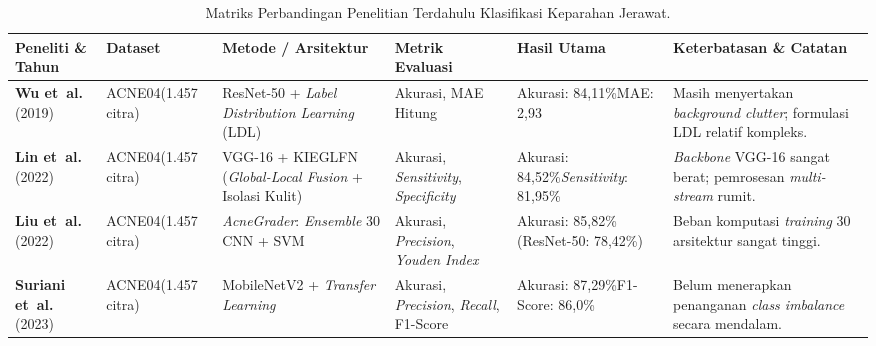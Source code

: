 \begin{table}[!htbp]
    \centering
    \caption{Matriks Perbandingan Penelitian Terdahulu Klasifikasi Keparahan Jerawat.}
    \label{tab:penelitian_terdahulu}
    \footnotesize
    \renewcommand{\arraystretch}{1.3}
    \setlength{\tabcolsep}{3.5pt}
    \begin{tabularx}{\textwidth}{
        >{\hsize=1.10\hsize\raggedright\arraybackslash}X
        >{\hsize=0.65\hsize\raggedright\arraybackslash}X
        >{\hsize=1.15\hsize\raggedright\arraybackslash}X
        >{\hsize=0.80\hsize\raggedright\arraybackslash}X
        >{\hsize=0.95\hsize\raggedright\arraybackslash}X
        >{\hsize=1.35\hsize\raggedright\arraybackslash}X
    }
        \toprule
        \textbf{Peneliti \& Tahun} & \textbf{Dataset} & \textbf{Metode / Arsitektur} & \textbf{Metrik Evaluasi} & \textbf{Hasil Utama} & \textbf{Keterbatasan \& Catatan} \\
        \midrule
        \textbf{Wu et~al.}\newline(2019)~\cite{wu2019} & ACNE04\newline(1.457 citra) & ResNet-50 + \textit{Label Distribution Learning} (LDL) & Akurasi, MAE Hitung & Akurasi: 84,11\%\newline MAE: 2,93 & Masih menyertakan \textit{background clutter}; formulasi LDL relatif kompleks. \\
        \midrule
        \textbf{Lin et~al.}\newline(2022)~\cite{lin2022} & ACNE04\newline(1.457 citra) & VGG-16 + KIEGLFN (\textit{Global-Local Fusion} + Isolasi Kulit) & Akurasi, \textit{Sensitivity}, \textit{Specificity} & Akurasi: 84,52\%\newline \textit{Sensitivity}: 81,95\% & \textit{Backbone} VGG-16 sangat berat; pemrosesan \textit{multi-stream} rumit. \\
        \midrule
        \textbf{Liu et~al.}\newline(2022)~\cite{liu2022} & ACNE04\newline(1.457 citra) & \textit{AcneGrader}: \textit{Ensemble} 30 CNN + SVM & Akurasi, \textit{Precision}, \textit{Youden Index} & Akurasi: 85,82\%\newline (ResNet-50: 78,42\%) & Beban komputasi \textit{training} 30 arsitektur sangat tinggi. \\
        \midrule
        \textbf{Suriani et~al.}\newline(2023)~\cite{suriani2023} & ACNE04\newline(1.457 citra) & MobileNetV2 + \textit{Transfer Learning} & Akurasi, \textit{Precision}, \textit{Recall}, F1-Score & Akurasi: 87,29\%\newline F1-Score: 86,0\% & Belum menerapkan penanganan \textit{class imbalance} secara mendalam. \\

\end{tabularx}
\end{table}
